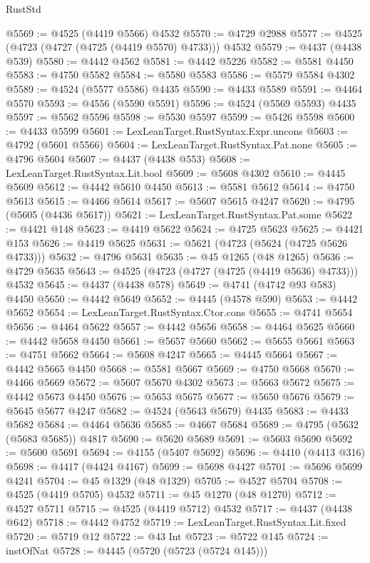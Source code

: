 \begin{lexlean}{RustStd}
\begin{coremodule}
@5569 := @4525 (@4419 @5566) @4532
@5570 := @4729 @2988
@5577 := @4525 (@4723 (@4727 (@4725 (@4419 @5570) @4733))) @4532
@5579 := @4437 (@4438 @539)
@5580 := @4442 @4562
@5581 := @4442 @5226
@5582 := @5581 @4450
@5583 := @4750 @5582
@5584 := @5580 @5583
@5586 := @5579 @5584 @4302
@5589 := @4524 (@5577 @5586) @4435
@5590 := @4433 @5589
@5591 := @4464 @5570
@5593 := @4556 (@5590 @5591)
@5596 := @4524 (@5569 @5593) @4435
@5597 := @5562 @5596
@5598 := @5530 @5597
@5599 := @5426 @5598
@5600 := @4433 @5599
@5601 := LexLeanTarget.RustSyntax.Expr.uncons
@5603 := @4792 (@5601 @5566)
@5604 := LexLeanTarget.RustSyntax.Pat.none
@5605 := @4796 @5604
@5607 := @4437 (@4438 @553)
@5608 := LexLeanTarget.RustSyntax.Lit.bool
@5609 := @5608 @4302
@5610 := @4445 @5609
@5612 := @4442 @5610 @4450
@5613 := @5581 @5612
@5614 := @4750 @5613
@5615 := @4466 @5614
@5617 := @5607 @5615 @4247
@5620 := @4795 (@5605 (@4436 @5617))
@5621 := LexLeanTarget.RustSyntax.Pat.some
@5622 := @4421 @148
@5623 := @4419 @5622
@5624 := @4725 @5623
@5625 := @4421 @153
@5626 := @4419 @5625
@5631 := @5621 (@4723 (@5624 (@4725 @5626 @4733)))
@5632 := @4796 @5631
@5635 := @45 @1265 (@48 @1265)
@5636 := @4729 @5635
@5643 := @4525 (@4723 (@4727 (@4725 (@4419 @5636) @4733))) @4532
@5645 := @4437 (@4438 @578)
@5649 := @4741 (@4742 @93 @583) @4450
@5650 := @4442 @5649
@5652 := @4445 (@4578 @590)
@5653 := @4442 @5652
@5654 := LexLeanTarget.RustSyntax.Ctor.cons
@5655 := @4741 @5654
@5656 := @4464 @5622
@5657 := @4442 @5656
@5658 := @4464 @5625
@5660 := @4442 @5658 @4450
@5661 := @5657 @5660
@5662 := @5655 @5661
@5663 := @4751 @5662
@5664 := @5608 @4247
@5665 := @4445 @5664
@5667 := @4442 @5665 @4450
@5668 := @5581 @5667
@5669 := @4750 @5668
@5670 := @4466 @5669
@5672 := @5607 @5670 @4302
@5673 := @5663 @5672
@5675 := @4442 @5673 @4450
@5676 := @5653 @5675
@5677 := @5650 @5676
@5679 := @5645 @5677 @4247
@5682 := @4524 (@5643 @5679) @4435
@5683 := @4433 @5682
@5684 := @4464 @5636
@5685 := @4667 @5684
@5689 := @4795 (@5632 (@5683 @5685)) @4817
@5690 := @5620 @5689
@5691 := @5603 @5690
@5692 := @5600 @5691
@5694 := @4155 (@5407 @5692)
@5696 := @4410 (@4413 @316)
@5698 := @4417 (@4424 @4167)
@5699 := @5698 @4427
@5701 := @5696 @5699 @4241
@5704 := @45 @1329 (@48 @1329)
@5705 := @4527 @5704
@5708 := @4525 (@4419 @5705) @4532
@5711 := @45 @1270 (@48 @1270)
@5712 := @4527 @5711
@5715 := @4525 (@4419 @5712) @4532
@5717 := @4437 (@4438 @642)
@5718 := @4442 @4752
@5719 := LexLeanTarget.RustSyntax.Lit.fixed
@5720 := @5719 @12
@5722 := @43 Int
@5723 := @5722 @145
@5724 := instOfNat
@5728 := @4445 (@5720 (@5723 (@5724 @145)))

\end{coremodule}
\end{lexlean}
